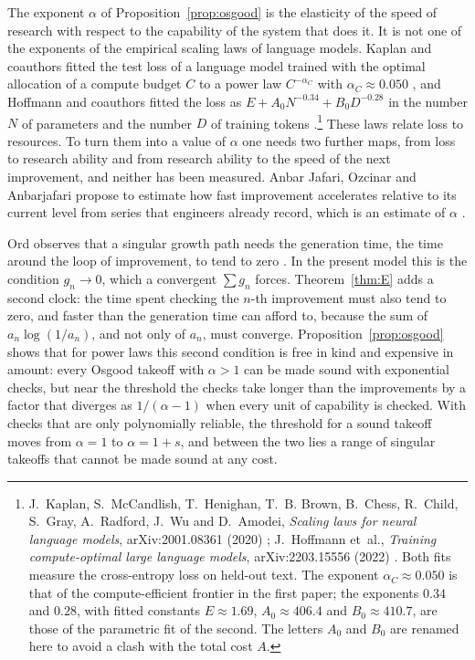 The exponent $\alpha$ of Proposition~\ref{prop:osgood} is the elasticity of the speed of research with respect to the capability of the system that does it. It is not one of the exponents of the empirical scaling laws of language models. Kaplan and coauthors fitted the test loss of a language model trained with the optimal allocation of a compute budget $C$ to a power law $C^{-\alpha_{C}}$ with $\alpha_{C}\approx0.050$ \cite{KMH20}, and Hoffmann and coauthors fitted the loss as $E+A_{0}N^{-0.34}+B_{0}D^{-0.28}$ in the number $N$ of parameters and the number $D$ of training tokens \cite{HBM22}.\footnote{J.~Kaplan, S.~McCandlish, T.~Henighan, T.~B. Brown, B.~Chess, R.~Child, S.~Gray, A.~Radford, J.~Wu and D.~Amodei, \emph{Scaling laws for neural language models}, arXiv:2001.08361 (2020) \cite{KMH20}; J.~Hoffmann et~al., \emph{Training compute-optimal large language models}, arXiv:2203.15556 (2022) \cite{HBM22}. Both fits measure the cross-entropy loss on held-out text. The exponent $\alpha_{C}\approx0.050$ is that of the compute-efficient frontier in the first paper; the exponents $0.34$ and $0.28$, with fitted constants $E\approx1.69$, $A_{0}\approx406.4$ and $B_{0}\approx410.7$, are those of the parametric fit of the second. The letters $A_{0}$ and $B_{0}$ are renamed here to avoid a clash with the total cost $A$.} These laws relate loss to resources. To turn them into a value of $\alpha$ one needs two further maps, from loss to research ability and from research ability to the speed of the next improvement, and neither has been measured. Anbar Jafari, Ozcinar and Anbarjafari propose to estimate how fast improvement accelerates relative to its current level from series that engineers already record, which is an estimate of $\alpha$ \cite{AOA25}.

Ord observes that a singular growth path needs the generation time, the time around the loop of improvement, to tend to zero \cite{Ord26}. In the present model this is the condition $g_{n}\to0$, which a convergent $\sum g_{n}$ forces. Theorem~\ref{thm:E} adds a second clock: the time spent checking the $n$-th improvement must also tend to zero, and faster than the generation time can afford to, because the sum of $a_{n}\log(1/a_{n})$, and not only of $a_{n}$, must converge. Proposition~\ref{prop:osgood} shows that for power laws this second condition is free in kind and expensive in amount: every Osgood takeoff with $\alpha>1$ can be made sound with exponential checks, but near the threshold the checks take longer than the improvements by a factor that diverges as $1/(\alpha-1)$ when every unit of capability is checked. With checks that are only polynomially reliable, the threshold for a sound takeoff moves from $\alpha=1$ to $\alpha=1+s$, and between the two lies a range of singular takeoffs that cannot be made sound at any cost.

